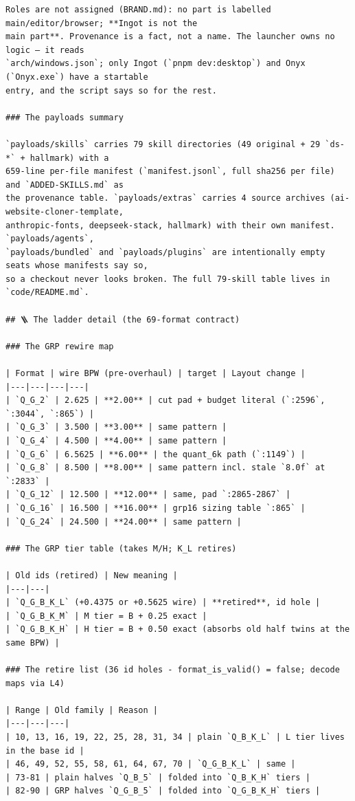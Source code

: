 \begin{Verbatim}[breaklines,breakanywhere,fontsize=\footnotesize]
Roles are not assigned (BRAND.md): no part is labelled main/editor/browser; **Ingot is not the
main part**. Provenance is a fact, not a name. The launcher owns no logic — it reads
`arch/windows.json`; only Ingot (`pnpm dev:desktop`) and Onyx (`Onyx.exe`) have a startable
entry, and the script says so for the rest.

### The payloads summary

`payloads/skills` carries 79 skill directories (49 original + 29 `ds-*` + hallmark) with a
659-line per-file manifest (`manifest.jsonl`, full sha256 per file) and `ADDED-SKILLS.md` as
the provenance table. `payloads/extras` carries 4 source archives (ai-website-cloner-template,
anthropic-fonts, deepseek-stack, hallmark) with their own manifest. `payloads/agents`,
`payloads/bundled` and `payloads/plugins` are intentionally empty seats whose manifests say so,
so a checkout never looks broken. The full 79-skill table lives in `code/README.md`.

## 🪜 The ladder detail (the 69-format contract)

### The GRP rewire map

| Format | wire BPW (pre-overhaul) | target | Layout change |
|---|---|---|---|
| `Q_G_2` | 2.625 | **2.00** | cut pad + budget literal (`:2596`, `:3044`, `:865`) |
| `Q_G_3` | 3.500 | **3.00** | same pattern |
| `Q_G_4` | 4.500 | **4.00** | same pattern |
| `Q_G_6` | 6.5625 | **6.00** | the quant_6k path (`:1149`) |
| `Q_G_8` | 8.500 | **8.00** | same pattern incl. stale `8.0f` at `:2833` |
| `Q_G_12` | 12.500 | **12.00** | same, pad `:2865-2867` |
| `Q_G_16` | 16.500 | **16.00** | grp16 sizing table `:865` |
| `Q_G_24` | 24.500 | **24.00** | same pattern |

### The GRP tier table (takes M/H; K_L retires)

| Old ids (retired) | New meaning |
|---|---|
| `Q_G_B_K_L` (+0.4375 or +0.5625 wire) | **retired**, id hole |
| `Q_G_B_K_M` | M tier = B + 0.25 exact |
| `Q_G_B_K_H` | H tier = B + 0.50 exact (absorbs old half twins at the same BPW) |

### The retire list (36 id holes - format_is_valid() = false; decode maps via L4)

| Range | Old family | Reason |
|---|---|---|
| 10, 13, 16, 19, 22, 25, 28, 31, 34 | plain `Q_B_K_L` | L tier lives in the base id |
| 46, 49, 52, 55, 58, 61, 64, 67, 70 | `Q_G_B_K_L` | same |
| 73-81 | plain halves `Q_B_5` | folded into `Q_B_K_H` tiers |
| 82-90 | GRP halves `Q_G_B_5` | folded into `Q_G_B_K_H` tiers |


\end{Verbatim}
